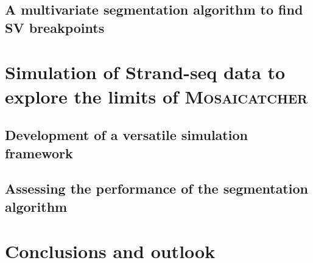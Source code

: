 \subsection{A multivariate segmentation algorithm to find SV breakpoints}
\label{sec:mosaic_segmentation}




\FloatBarrier
\section{Simulation of Strand-seq data to explore the limits of \textsc{Mosaicatcher}}
\label{sec:mosaic_simul}

\subsection{Development of a versatile simulation framework}

\subsection{Assessing the performance of the segmentation algorithm}

\section{Conclusions and outlook}
\label{sec:mosaic_conclusion}



